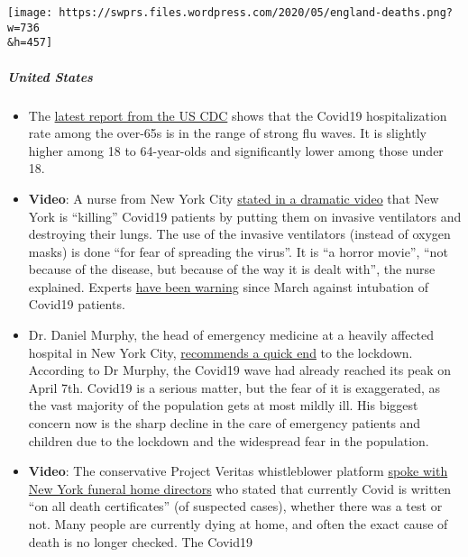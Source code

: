 \texttt{[image: https://swprs.files.wordpress.com/2020/05/england-deaths.png?w=736\\\&h=457]}

\hypertarget{united-states}{%
\subparagraph{\texorpdfstring{\textbf{United
States}}{United States}}\label{united-states}}

\begin{itemize}
\tightlist
\item
  The
  \href{https://www.cdc.gov/coronavirus/2019-ncov/covid-data/covidview/index.html}{latest
  report from the US CDC} shows that the Covid19 hospitalization rate
  among the over-65s is in the range of strong flu waves. It is slightly
  higher among 18 to 64-year-olds and significantly lower among those
  under 18.
\item
  \textbf{Video}: A nurse from New York City
  \href{https://www.dailymail.co.uk/news/article-8262351/Nurse-New-York-claims-city-killing-COVID-19-patients-putting-ventilators.html}{stated
  in a dramatic video} that New York is ``killing'' Covid19 patients by
  putting them on invasive ventilators and destroying their lungs. The
  use of the invasive ventilators (instead of oxygen masks) is done
  ``for fear of spreading the virus''. It is ``a horror movie'', ``not
  because of the disease, but because of the way it is dealt with'', the
  nurse explained. Experts
  \href{https://off-guardian.org/2020/05/06/covid19-are-ventilators-killing-people/}{have
  been warning} since March against intubation of Covid19 patients.
\item
  Dr. Daniel Murphy, the head of emergency medicine at a heavily
  affected hospital in New York City,
  \href{https://nypost.com/2020/04/27/ive-worked-the-coronavirus-front-line-and-i-say-its-time-to-start-opening-up/}{recommends
  a quick end} to the lockdown. According to Dr Murphy, the Covid19 wave
  had already reached its peak on April 7th. Covid19 is a serious
  matter, but the fear of it is exaggerated, as the vast majority of the
  population gets at most mildly ill. His biggest concern now is the
  sharp decline in the care of emergency patients and children due to
  the lockdown and the widespread fear in the population.
\item
  \textbf{Video}: The conservative Project Veritas whistleblower
  platform \href{https://www.youtube.com/watch?v=g5f_6ltv7oI}{spoke with
  New York funeral home directors} who stated that currently Covid is
  written ``on all death certificates'' (of suspected cases), whether
  there was a test or not. Many people are currently dying at home, and
  often the exact cause of death is no longer checked. The Covid19

\end{itemize}
